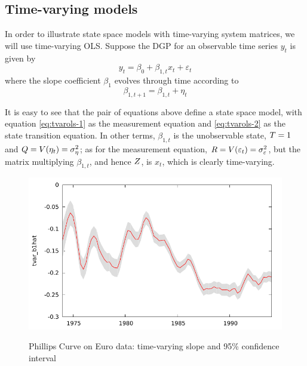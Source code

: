 \subsection{Time-varying models}
\label{sec:example_PhCurve}

In order to illustrate state space models with time-varying system
matrices, we will use time-varying OLS. Suppose the DGP for an
observable time series $y_t$ is given by
\begin{equation}
  \label{eq:tvarols-1}
    y_t = \beta_0 + \beta_{1,t} x_t + \varepsilon_t
\end{equation}
where the slope coefficient $\beta_1$ evolves through time according to
\begin{equation}
  \label{eq:tvarols-2}
    \beta_{1,t+1} = \beta_{1,t} + \eta_t
\end{equation}

It is easy to see that the pair of equations above define a state
space model, with equation \eqref{eq:tvarols-1} as the measurement
equation and \eqref{eq:tvarols-2} as the state transition equation. In
other terms, $\beta_{1,t}$ is the unobservable state, $T = 1$
and $Q = V(\eta_t) = \sigma^2_{\eta}$; as for the measurement
equation, $R = V(\varepsilon_t) = \sigma^2_{\varepsilon}$, but
the matrix multiplying $\beta_{1,t}$, and hence $Z$, is $x_t$,
which is clearly time-varying.

\begin{figure}[htbp]
  \centering
    \includegraphics{figures/timevar_PhCurve} \\[10pt]
  \caption{Phillips Curve on Euro data: time-varying slope and
    95\% confidence interval}
  \label{fig:tvar}
\end{figure}

